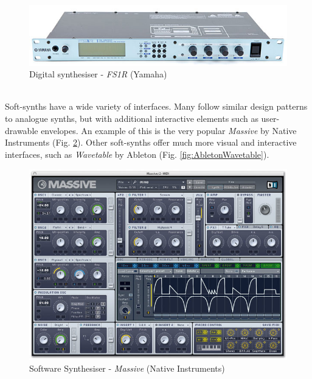 \documentclass[11pt, oneside]{report}   	%
\begin{document}
%
\begin{figure}[h] 
	\centering
	\includegraphics[trim = {0, 0.2cm, 0, 0.5cm}, clip, width = 5in]{yamaha_fs1r.jpg}
	\caption{Digital synthesiser - \emph{FS1R} (Yamaha) \cite{FS1R}}
	\label{fig:YamahFS1R}
	\vspace{-10pt}
\end{figure}\\
Soft-synths have a wide variety of interfaces. Many follow similar design patterns to analogue synths, but with additional interactive elements such as user-drawable envelopes. An example of this is the very popular \emph{Massive} by Native Instruments \cite{Massive} (Fig. \ref{fig:MassiveNI}). Other soft-synths offer much more visual and interactive interfaces, such as \emph{Wavetable} by Ableton \cite{Wavetable} (Fig. \ref{fig:AbletonWavetable}).

\begin{figure}[h] 
	\centering
	\includegraphics[width = 5in]{MassiveNI.jpg}
	\vspace{-5pt}
	\caption{Software Synthesiser - \emph{Massive} (Native Instruments) \cite{Massive}}
	\label{fig:MassiveNI}
	\vspace{-10pt}
\end{figure}
\end{document}
